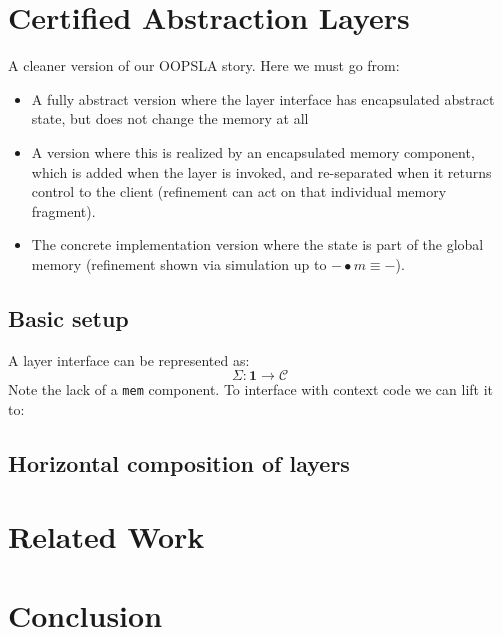 \documentclass[acmsmall,screen,review,anonymous]{acmart}
\begin{document}
\section{Certified Abstraction Layers}

A cleaner version of our OOPSLA story.
Here we must go from:
\begin{itemize}
  \item A fully abstract version where the layer interface
    has encapsulated abstract state,
    but does not change the memory at all
  \item A version where this is realized by an encapsulated
    memory component,
    which is added when the layer is invoked,
    and re-separated when it returns control to the client
    (refinement can act on that individual memory fragment).
  \item The concrete implementation version
    where the state is part of the global memory
    (refinement shown via
    simulation up to ${-} \bullet m \equiv {-}$).
\end{itemize}

\subsection{Basic setup}

A layer interface can be represented as:
\[
  \Sigma : \mathbf{1} \rightarrow \mathcal{C}
\]
Note the lack of a \texttt{mem} component.
To interface with context code we can lift it to:
\[
\]

\subsection{Horizontal composition of layers}

\section{Related Work}

\section{Conclusion}


\end{document}
